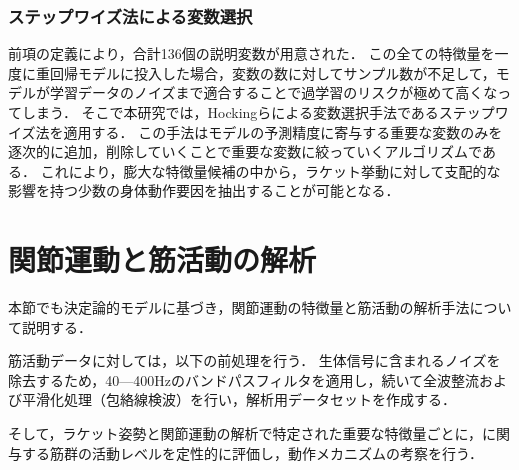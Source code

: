 \documentclass[../main]{subfiles}
\begin{document}
\subsubsection{ステップワイズ法による変数選択}
前項の定義により，合計136個の説明変数が用意された．
この全ての特徴量を一度に重回帰モデルに投入した場合，変数の数に対してサンプル数が不足して，モデルが学習データのノイズまで適合することで過学習のリスクが極めて高くなってしまう．
そこで本研究では，Hockingらによる変数選択手法であるステップワイズ法を適用する．
この手法はモデルの予測精度に寄与する重要な変数のみを逐次的に追加，削除していくことで重要な変数に絞っていくアルゴリズムである．
これにより，膨大な特徴量候補の中から，ラケット挙動に対して支配的な影響を持つ少数の身体動作要因を抽出することが可能となる．


\section{関節運動と筋活動の解析}
\label{sec:analysis_EMG}
本節でも決定論的モデルに基づき，関節運動の特徴量と筋活動の解析手法について説明する．

筋活動データに対しては，以下の前処理を行う．
生体信号に含まれるノイズを除去するため，40—400Hzのバンドパスフィルタを適用し，続いて全波整流および平滑化処理（包絡線検波）を行い，解析用データセットを作成する．

そして，ラケット姿勢と関節運動の解析で特定された重要な特徴量ごとに，に関与する筋群の活動レベルを定性的に評価し，動作メカニズムの考察を行う．



\end{document}
